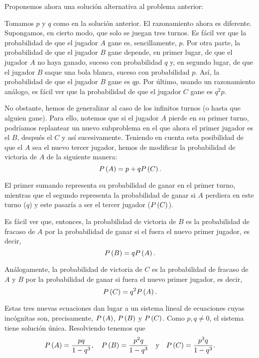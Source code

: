 Proponemos ahora una solución alternativa al problema anterior:

\begin{solution}
  Tomamos $p$ y $q$ como en la solución anterior. El razonamiento ahora es
  diferente. Supongamos, en cierto modo, que solo se juegan tres turnos. Es
  fácil ver que la probabilidad de que el jugador $A$ gane es,
  sencillamente, $p$. Por otra parte, la probabilidad de que el jugador $B$
  gane depende, en primer lugar, de que el jugador $A$ no haya ganado,
  suceso con probabilidad $q$ y, en segundo lugar, de que el jugador $B$
  saque una bola blanca, suceso con probabilidad $p$. Así, la probabilidad
  de que el jugador $B$ gane es $qp$. Por último, usando un razonamiento
  análogo, es fácil ver que la probabilidad de que el jugador $C$ gane es
  $q^2p$.

  No obstante, hemos de generalizar al caso de los infinitos turnos (o
  hasta que alguien gane). Para ello, notemos que si el jugador $A$ pierde
  en su primer turno, podríamos replantear un nuevo subproblema en el que
  ahora el primer jugador es el $B$, después el $C$ y así sucesivamente.
  Teniendo en cuenta esta posibilidad de que el $A$ sea el nuevo tercer
  jugador, hemos de modificar la probabilidad de victoria de $A$ de la
  siguiente manera:
  \[
    P\left(A\right) = p + qP\left(C\right).
  \]

  El primer sumando representa su probabilidad de ganar en el primer turno,
  mientras que el segundo representa la probabilidad de ganar si $A$
  perdiera en este turno ($q$) y este pasaría a ser el tercer jugador
  ($P\left(C\right)$).

  Es fácil ver que, entonces, la probabilidad de victoria de $B$ es la
  probabilidad de fracaso de $A$ por la probabilidad de ganar si el fuera
  el nuevo primer jugador, es decir,
  \[
    P\left(B\right) = qP\left(A\right).
  \]

  Análogamente, la probabilidad de victoria de $C$ es la probabilidad de
  fracaso de $A$ y $B$ por la probabilidad de ganar si fuera el nuevo
  primer jugador, es decir,
  \[
    P\left(C\right) = q^2P\left(A\right).
  \]

  Estas tres nuevas ecuaciones dan lugar a un sistema lineal de ecuaciones
  cuyas incógnitas son, precisamente, $P\left(A\right)$, $P\left(B\right)$ y $P\left(C\right)$.
  Como $p, q \neq 0$, el sistema tiene solución única. Resolviendo tenemos
  que
  \[
    P\left(A\right) = \frac{pq}{1 - q^3}, \quad
    P\left(B\right) = \frac{p^2q}{1 - q^3} \quad \text{y} \quad
    P\left(C\right) = \frac{p^3q}{1 - q^3}.
  \]
\end{solution}
